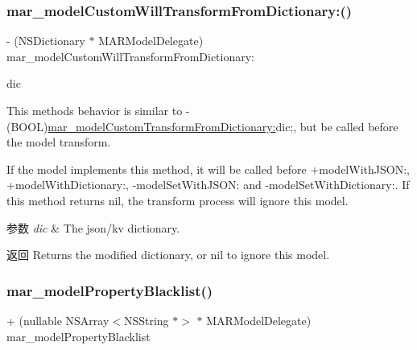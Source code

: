 \subsubsection{\texorpdfstring{mar\+\_\+model\+Custom\+Will\+Transform\+From\+Dictionary\+:()}{mar\_modelCustomWillTransformFromDictionary:()}}
{\footnotesize\ttfamily -\/ (N\+S\+Dictionary $\ast$ M\+A\+R\+Model\+Delegate) mar\+\_\+model\+Custom\+Will\+Transform\+From\+Dictionary\+: \begin{DoxyParamCaption}\item[{(N\+S\+Dictionary $\ast$)}]{dic }\end{DoxyParamCaption}}

This method\textquotesingle{}s behavior is similar to {\ttfamily -\/ (B\+O\+OL)\hyperlink{protocol_m_a_r_model_delegate_01-p_ab46fc5681d9e70f11ada2a49b8eae750}{mar\+\_\+model\+Custom\+Transform\+From\+Dictionary\+:}dic;}, but be called before the model transform.

If the model implements this method, it will be called before {\ttfamily +model\+With\+J\+S\+ON\+:}, {\ttfamily +model\+With\+Dictionary\+:}, {\ttfamily -\/model\+Set\+With\+J\+S\+ON\+:} and {\ttfamily -\/model\+Set\+With\+Dictionary\+:}. If this method returns nil, the transform process will ignore this model.


\begin{DoxyParams}{参数}
{\em dic} & The json/kv dictionary.\\
\hline
\end{DoxyParams}
\begin{DoxyReturn}{返回}
Returns the modified dictionary, or nil to ignore this model. 
\end{DoxyReturn}
\mbox{\label{protocol_m_a_r_model_delegate_01-p_a3747b7f6f691ddf3b09dbac606fdd691}} 
\subsubsection{\texorpdfstring{mar\+\_\+model\+Property\+Blacklist()}{mar\_modelPropertyBlacklist()}}
{\footnotesize\ttfamily + (nullable N\+S\+Array$<$N\+S\+String $\ast$$>$ $\ast$ M\+A\+R\+Model\+Delegate) mar\+\_\+model\+Property\+Blacklist \begin{DoxyParamCaption}{ }\end{DoxyParamCaption}}

